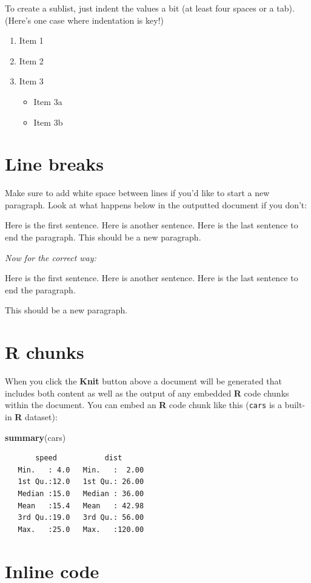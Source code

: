 \documentclass[msc,numbers]{coppe}
\providecommand{\tightlist}{%
  \setlength{\itemsep}{0pt}\setlength{\parskip}{0pt}}
\newenvironment{Shaded}{\begin{snugshade}}{\end{snugshade}}
\newcommand{\KeywordTok}[1]{\textcolor[rgb]{0.13,0.29,0.53}{\textbf{#1}}}
\newcommand{\NormalTok}[1]{#1}
\begin{document}
  To create a sublist, just indent the values a bit (at least four spaces or a tab). (Here's one case where indentation is key!)
  \begin{enumerate}
  \def\labelenumi{\arabic{enumi}.}
  \tightlist
  \item
    Item 1
  \item
    Item 2
  \item
    Item 3
    \begin{itemize}
    \tightlist
    \item
      Item 3a
    \item
      Item 3b
    \end{itemize}
  \end{enumerate}
  \hypertarget{line-breaks}{%
  \section{Line breaks}\label{line-breaks}}
  
  Make sure to add white space between lines if you'd like to start a new paragraph. Look at what happens below in the outputted document if you don't:
  
  Here is the first sentence. Here is another sentence. Here is the last sentence to end the paragraph.
  This should be a new paragraph.
  
  \emph{Now for the correct way:}
  
  Here is the first sentence. Here is another sentence. Here is the last sentence to end the paragraph.
  
  This should be a new paragraph.
  
  \hypertarget{r-chunks}{%
  \section{R chunks}\label{r-chunks}}
  
  When you click the \textbf{Knit} button above a document will be generated that includes both content as well as the output of any embedded \textbf{R} code chunks within the document. You can embed an \textbf{R} code chunk like this (\texttt{cars} is a built-in \textbf{R} dataset):
  \begin{Shaded}
  \begin{Highlighting}[]
  \KeywordTok{summary}\NormalTok{(cars)}
  \end{Highlighting}
  \end{Shaded}
  \begin{verbatim}
       speed           dist       
   Min.   : 4.0   Min.   :  2.00  
   1st Qu.:12.0   1st Qu.: 26.00  
   Median :15.0   Median : 36.00  
   Mean   :15.4   Mean   : 42.98  
   3rd Qu.:19.0   3rd Qu.: 56.00  
   Max.   :25.0   Max.   :120.00  
  \end{verbatim}
  \hypertarget{inline-code}{%
  \section{Inline code}\label{inline-code}}
  
\end{document}

